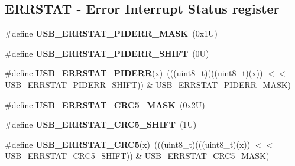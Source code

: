\subsection*{E\+R\+R\+S\+T\+AT -\/ Error Interrupt Status register}
\begin{DoxyCompactItemize}
\item 
\mbox{\label{group___u_s_b___register___masks_gadf359cce923ca198235ecef76b5cc789}} 
\#define {\bfseries U\+S\+B\+\_\+\+E\+R\+R\+S\+T\+A\+T\+\_\+\+P\+I\+D\+E\+R\+R\+\_\+\+M\+A\+SK}~(0x1\+U)
\item 
\mbox{\label{group___u_s_b___register___masks_gaf10f584ce9bbe8d7c0d0b8a6a4f61352}} 
\#define {\bfseries U\+S\+B\+\_\+\+E\+R\+R\+S\+T\+A\+T\+\_\+\+P\+I\+D\+E\+R\+R\+\_\+\+S\+H\+I\+FT}~(0\+U)
\item 
\mbox{\label{group___u_s_b___register___masks_gaaea4b668baa49e256f30660df4cfdd38}} 
\#define {\bfseries U\+S\+B\+\_\+\+E\+R\+R\+S\+T\+A\+T\+\_\+\+P\+I\+D\+E\+RR}(x)~(((uint8\+\_\+t)(((uint8\+\_\+t)(x)) $<$$<$ U\+S\+B\+\_\+\+E\+R\+R\+S\+T\+A\+T\+\_\+\+P\+I\+D\+E\+R\+R\+\_\+\+S\+H\+I\+FT)) \& U\+S\+B\+\_\+\+E\+R\+R\+S\+T\+A\+T\+\_\+\+P\+I\+D\+E\+R\+R\+\_\+\+M\+A\+SK)
\item 
\mbox{\label{group___u_s_b___register___masks_ga81c84e3a4b78674374f9598770b4b8e2}} 
\#define {\bfseries U\+S\+B\+\_\+\+E\+R\+R\+S\+T\+A\+T\+\_\+\+C\+R\+C5\+\_\+\+M\+A\+SK}~(0x2\+U)
\item 
\mbox{\label{group___u_s_b___register___masks_ga6011724ce1da6bdf3bc543b8d9d0ad05}} 
\#define {\bfseries U\+S\+B\+\_\+\+E\+R\+R\+S\+T\+A\+T\+\_\+\+C\+R\+C5\+\_\+\+S\+H\+I\+FT}~(1\+U)
\item 
\mbox{\label{group___u_s_b___register___masks_ga01e528d8babafbb91621ff22c58c9923}} 
\#define {\bfseries U\+S\+B\+\_\+\+E\+R\+R\+S\+T\+A\+T\+\_\+\+C\+R\+C5}(x)~(((uint8\+\_\+t)(((uint8\+\_\+t)(x)) $<$$<$ U\+S\+B\+\_\+\+E\+R\+R\+S\+T\+A\+T\+\_\+\+C\+R\+C5\+\_\+\+S\+H\+I\+FT)) \& U\+S\+B\+\_\+\+E\+R\+R\+S\+T\+A\+T\+\_\+\+C\+R\+C5\+\_\+\+M\+A\+SK)
\item 
\mbox{\label{group___u_s_b___register___masks_gac9682448ca13abab007c9438e811610c}} 

\end{DoxyCompactItemize}
